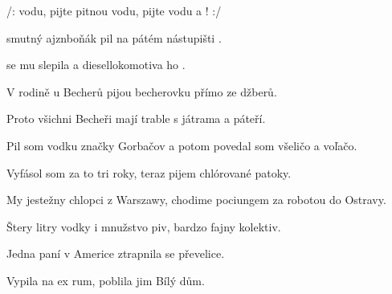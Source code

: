 
\zr
/:  vodu, pijte pitnou vodu, pijte vodu a  ! :/
\kr

\zs
{} smutný ajznboňák pil na pátém nástupišti .

 se mu slepila a diesellokomotiva ho .
\ks

\zr  \kr

\zs
V rodině u Becherů pijou becherovku přímo ze džberů.

Proto všichni Becheři mají trable s játrama a páteří.
\ks

\zr  \kr

\zs
Pil som vodku značky Gorbačov a potom povedal som všeličo a voľačo.

Vyfásol som za to tri roky, teraz pijem chlórované patoky.
\ks

\zr  \kr

\zs
My jestežny chlopci z Warszawy, chodime pociungem za robotou do Ostravy.

Štery litry vodky i mnužstvo piv, bardzo fajny kolektiv.
\ks

\zr  \kr

\zs
Jedna paní v Americe ztrapnila se převelice.

Vypila na ex rum, poblila jim Bílý dům.
\ks

\zr  \kr

\kp





